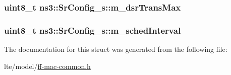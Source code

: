 \subsubsection[{\texorpdfstring{m\+\_\+dsr\+Trans\+Max}{m_dsrTransMax}}]{\setlength{\rightskip}{0pt plus 5cm}uint8\+\_\+t ns3\+::\+Sr\+Config\+\_\+s\+::m\+\_\+dsr\+Trans\+Max}\hypertarget{structns3_1_1SrConfig__s_a2f13842a83158b691417153c94c18e97}{}\label{structns3_1_1SrConfig__s_a2f13842a83158b691417153c94c18e97}
\subsubsection[{\texorpdfstring{m\+\_\+sched\+Interval}{m_schedInterval}}]{\setlength{\rightskip}{0pt plus 5cm}uint8\+\_\+t ns3\+::\+Sr\+Config\+\_\+s\+::m\+\_\+sched\+Interval}\hypertarget{structns3_1_1SrConfig__s_ac62406789ffe8a4ea8fb62bce3ee2143}{}\label{structns3_1_1SrConfig__s_ac62406789ffe8a4ea8fb62bce3ee2143}


The documentation for this struct was generated from the following file\+:\begin{DoxyCompactItemize}
\item 
lte/model/\hyperlink{ff-mac-common_8h}{ff-\/mac-\/common.\+h}\end{DoxyCompactItemize}

